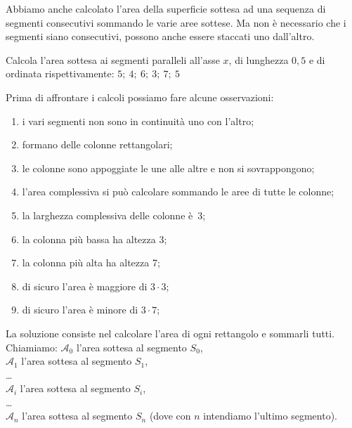 Abbiamo anche calcolato l'area della superficie sottesa ad una sequenza di 
segmenti consecutivi sommando le varie aree sottese. Ma non è necessario che 
i segmenti siano consecutivi, possono anche essere staccati uno dall'altro.

\begin{esempio}
Calcola l'area sottesa ai segmenti paralleli all'asse \(x\), di lunghezza 
\(0,5\) e di ordinata rispettivamente: \quad 
\(5;~4;~6;~3;~7;~5\)

\begin{minipage}{.29\textwidth}
\begin{inaccessibleblock}
  \areasottesasegmenti
\end{inaccessibleblock}
\end{minipage}
\hfill
\begin{minipage}{.69\textwidth}
Prima di affrontare i calcoli possiamo fare alcune osservazioni:
\begin{enumerate} [nosep]
 \item i vari segmenti non sono in continuità uno con l'altro;
 \item formano delle colonne rettangolari;
 \item le colonne sono appoggiate le une alle altre e non si sovrappongono;
 \item l'area complessiva si può calcolare sommando le aree di tutte le 
colonne;
 \item la larghezza complessiva delle colonne è~3;
 \item la colonna più bassa ha altezza 3;
 \item la colonna più alta ha altezza 7;
 \item di sicuro l'area è maggiore di \(3 \cdot 3\);
 \item di sicuro l'area è minore di \(3 \cdot 7\);
\end{enumerate}
\end{minipage}
\end{esempio}

La soluzione consiste nel calcolare l'area di ogni rettangolo e sommarli 
tutti.
Chiamiamo:
\(\mathcal{A}_0\) l'area sottesa al segmento \(S_0\),\\
\(\mathcal{A}_1\) l'area sottesa al segmento \(S_1\),\\
\dots\\
\(\mathcal{A}_i\) l'area sottesa al segmento \(S_i\),\\
\dots\\
\(\mathcal{A}_n\) l'area sottesa al segmento \(S_n\)
\quad
(dove con \(n\) intendiamo l'ultimo segmento).\\

